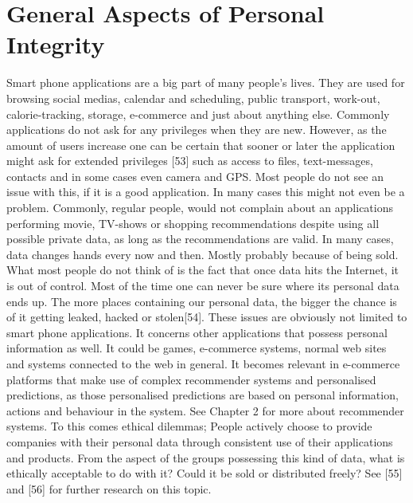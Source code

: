 \section{General Aspects of Personal Integrity}
Smart phone applications are a big part of many people's lives. They are used for browsing social medias, calendar and scheduling, public transport, work-out, calorie-tracking, storage, e-commerce and just about anything else. Commonly applications do not ask for any privileges when they are new. However, as the amount of users increase one can be certain that sooner or later the application might ask for extended privileges [53] such as access to files, text-messages, contacts and in some cases even camera and GPS. Most people do not see an issue with this, if it is a good application. In many cases this might not even be a problem. Commonly, regular people, would not complain about an applications performing movie, TV-shows or shopping recommendations despite using all possible private data, as long as the recommendations are valid. In many cases, data changes hands every now and then. Mostly probably because of being sold. What most people do not think of is the fact that once data hits the Internet, it is out of control. Most of the time one can never be sure where its personal data ends up. The more places containing our personal data, the bigger the chance is of it getting leaked, hacked or stolen[54]. These issues are obviously not limited to smart phone applications. It concerns other applications that possess personal information as well. It could be games, e-commerce systems, normal web sites and systems connected to the web in general. It becomes relevant in e-commerce platforms that make use of complex recommender systems and personalised predictions, as those personalised predictions are based on personal information, actions and behaviour in the system. See Chapter 2 for more about recommender systems. To this comes ethical dilemmas; People actively choose to provide companies with their personal data through consistent use of their applications and products. From the aspect of the groups possessing this kind of data, what is ethically acceptable to do with it? Could it be sold or distributed freely? See [55] and [56] for further research on this topic.


